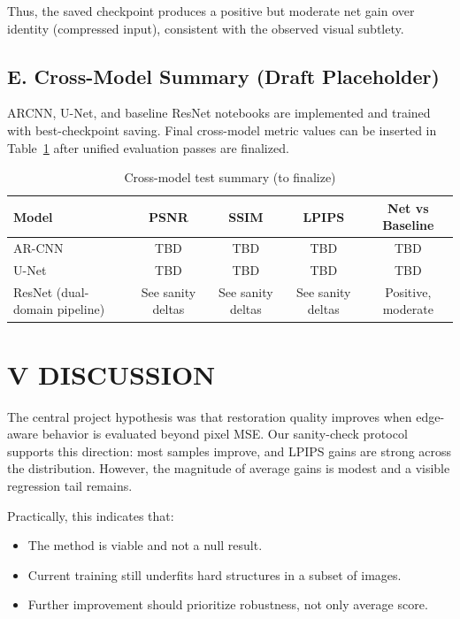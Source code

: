 \documentclass[12pt]{article}
\begin{document}
Thus, the saved checkpoint produces a positive but moderate net gain over identity (compressed input), consistent with the observed visual subtlety.

\subsection*{E. Cross-Model Summary (Draft Placeholder)}

ARCNN, U-Net, and baseline ResNet notebooks are implemented and trained with best-checkpoint saving. Final cross-model metric values can be inserted in Table~\ref{tab:crossmodel} after unified evaluation passes are finalized.

\begin{table}[H]
\centering
\caption{Cross-model test summary (to finalize)}
\label{tab:crossmodel}
\begin{tabular}{l c c c c}
\toprule
Model & PSNR & SSIM & LPIPS & Net vs Baseline \\
\midrule
AR-CNN & TBD & TBD & TBD & TBD \\
U-Net & TBD & TBD & TBD & TBD \\
ResNet (dual-domain pipeline) & See sanity deltas & See sanity deltas & See sanity deltas & Positive, moderate \\
\bottomrule
\end{tabular}
\end{table}

\section*{{\large V}\small{ DISCUSSION}}

The central project hypothesis was that restoration quality improves when edge-aware behavior is evaluated beyond pixel MSE. Our sanity-check protocol supports this direction: most samples improve, and LPIPS gains are strong across the distribution. However, the magnitude of average gains is modest and a visible regression tail remains.

Practically, this indicates that:
\begin{itemize}
    \item The method is viable and not a null result.
    \item Current training still underfits hard structures in a subset of images.
    \item Further improvement should prioritize robustness, not only average score.
\end{itemize}
\end{document}
